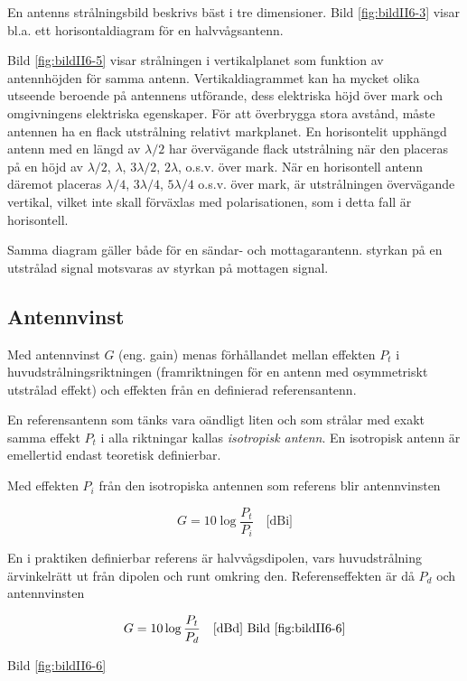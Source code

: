 En antenns strålningsbild beskrivs bäst i tre dimensioner. Bild \ref{fig:bildII6-3}
visar bl.a. ett horisontaldiagram för en halvvågsantenn.

Bild \ref{fig:bildII6-5} visar strålningen i vertikalplanet som funktion av
antennhöjden för samma antenn. Vertikaldiagrammet kan ha mycket olika
utseende beroende på antennens utförande, dess elektriska höjd över
mark och omgivningens elektriska egenskaper. För att överbrygga stora
avstånd, måste antennen ha en flack utstrålning relativt
markplanet. En horisontelit upphängd antenn med en längd av
\(\lambda/2\) har övervägande flack utstrålning när den placeras på en
höjd av \(\lambda/2\), \(\lambda\), \(3\lambda/2\), \(2\lambda\),
o.s.v. över mark. När en horisontell antenn däremot placeras
\(\lambda/4\), \(3\lambda/4\), \(5\lambda/4\) o.s.v. över mark, är
utstrålningen övervägande vertikal, vilket inte skall förväxlas med
polarisationen, som i detta fall är horisontell.

Samma diagram gäller både för en sändar- och mottagarantenn. styrkan
på en utstrålad signal motsvaras av styrkan på mottagen signal.

\subsection{Antennvinst}

Med antennvinst \(G\) (eng. gain) menas förhållandet mellan effekten
\(P_t\) i huvudstrålningsriktningen (framriktningen för en antenn med
osymmetriskt utstrålad effekt) och effekten från en definierad
referensantenn.

En referensantenn som tänks vara oändligt liten och som strålar med
exakt samma effekt \(P_t\) i alla riktningar kallas \emph{isotropisk
  antenn}.  En isotropisk antenn är emellertid endast teoretisk
definierbar.

Med effekten \(P_i\) från den isotropiska antennen som referens blir
antennvinsten

\[G = 10 \log\frac{P_t}{P_i} \quad \text{[dBi]}\]

En i praktiken definierbar referens är halvvågsdipolen, vars
huvudstrålning ärvinkelrätt ut från dipolen och runt omkring den.
Referenseffekten är då \(P_d\) och antennvinsten

\[G = 10 \log\frac{P_t}{P_d} \quad \text{[dBd] Bild \ref{fig:bildII6-6}}\]

Bild \ref{fig:bildII6-6}

